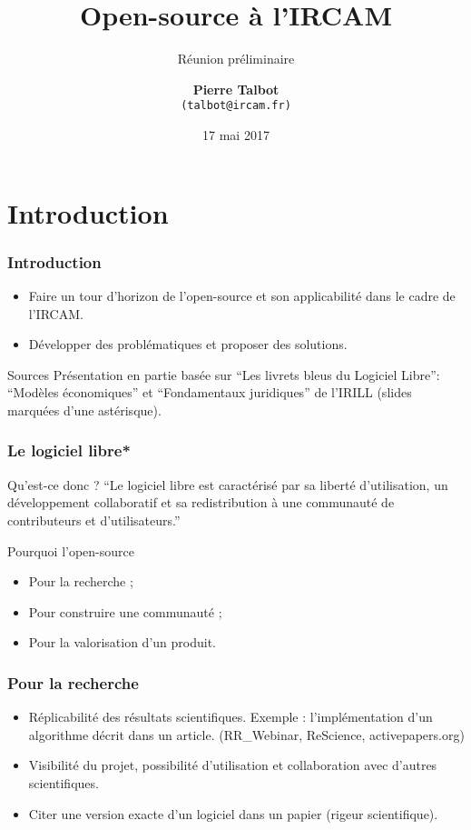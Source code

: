 \documentclass[xcolor=dvipsnames]{beamer}
\title[Open-source]{Open-source à l'IRCAM}
\subtitle{Réunion préliminaire}
\author[Pierre Talbot]{\textbf{Pierre Talbot}\\
\texttt{(talbot@ircam.fr)}}
\institute[IRCAM]{Institut de Recherche et Coordination Acoustique/Musique (IRCAM)}
\date[]{17 mai 2017}
\begin{document}
\maketitle

\section{Introduction}

\begin{frame}
\frametitle{Introduction}
\begin{itemize}
\item Faire un tour d'horizon de l'open-source et son applicabilité dans le cadre de l'IRCAM.
\item Développer des problématiques et proposer des solutions.
\end{itemize}
\begin{block}{Sources}
Présentation en partie basée sur ``Les livrets bleus du Logiciel Libre'': ``Modèles économiques'' et ``Fondamentaux juridiques'' de l'IRILL (slides marquées d'une astérisque).
\end{block}
\end{frame}

\begin{frame}
\frametitle{Le logiciel libre*}

\begin{block}{Qu'est-ce donc ?}
``Le logiciel libre est caractérisé par sa liberté d'utilisation, un développement collaboratif et sa redistribution à une communauté de contributeurs et d'utilisateurs.''
\end{block}

\begin{block}{Pourquoi l'open-source}
\begin{itemize}
\item Pour la recherche ;
\item Pour construire une communauté ;
\item Pour la valorisation d'un produit.
\end{itemize}
\end{block}

\end{frame}

\begin{frame}
\frametitle{Pour la recherche}
\begin{itemize}
\item Réplicabilité des résultats scientifiques. Exemple : l'implémentation d'un algorithme décrit dans un article. (RR_Webinar, ReScience, activepapers.org)
\item Visibilité du projet, possibilité d'utilisation et collaboration avec d'autres scientifiques.
\item Citer une version exacte d'un logiciel dans un papier (rigeur scientifique).
\end{itemize}
\end{frame}
\end{document}
